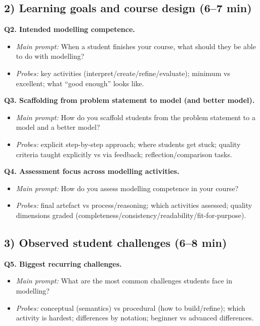 \subsection*{2) Learning goals and course design (6--7 min)}
\textbf{Q2. Intended modelling competence.}
\begin{itemize}
  \item \emph{Main prompt:} When a student finishes your course, what should they be able to do with modelling?
  \item \emph{Probes:} key activities (interpret/create/refine/evaluate); minimum vs excellent; what “good enough” looks like.
\end{itemize}

\textbf{Q3. Scaffolding from problem statement to model (and better model).}
\begin{itemize}
  \item \emph{Main prompt:} How do you scaffold students from the problem statement to a model and a better model?
  \item \emph{Probes:} explicit step-by-step approach; where students get stuck; quality criteria taught explicitly vs via feedback; reflection/comparison tasks.
\end{itemize}

\textbf{Q4. Assessment focus across modelling activities.}
\begin{itemize}
  \item \emph{Main prompt:} How do you assess modelling competence in your course?
  \item \emph{Probes:} final artefact vs process/reasoning; which activities assessed; quality dimensions graded (completeness/consistency/readability/fit-for-purpose).
\end{itemize}

\subsection*{3) Observed student challenges (6--8 min)}
\textbf{Q5. Biggest recurring challenges.}
\begin{itemize}
  \item \emph{Main prompt:} What are the most common challenges students face in modelling?
  \item \emph{Probes:} conceptual (semantics) vs procedural (how to build/refine); which activity is hardest; differences by notation; beginner vs advanced differences.
\end{itemize}

